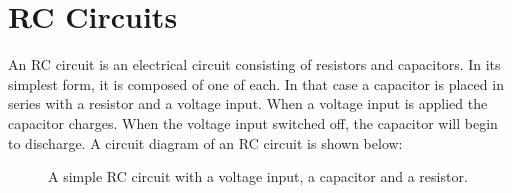 \chapter{RC Circuits} \label{chap:RC}
An RC circuit is an electrical circuit consisting of resistors and capacitors. In its simplest form, it is composed of one of each. In that case a capacitor is placed in series with a resistor and a voltage input. When a voltage input is applied the capacitor charges. When the voltage input switched off, the capacitor will begin to discharge. A circuit diagram of an RC circuit is shown below:
\\
\begin{figure}[H]
 
 \caption{A simple RC circuit with a voltage input, a capacitor and a resistor.}
\end{figure}
